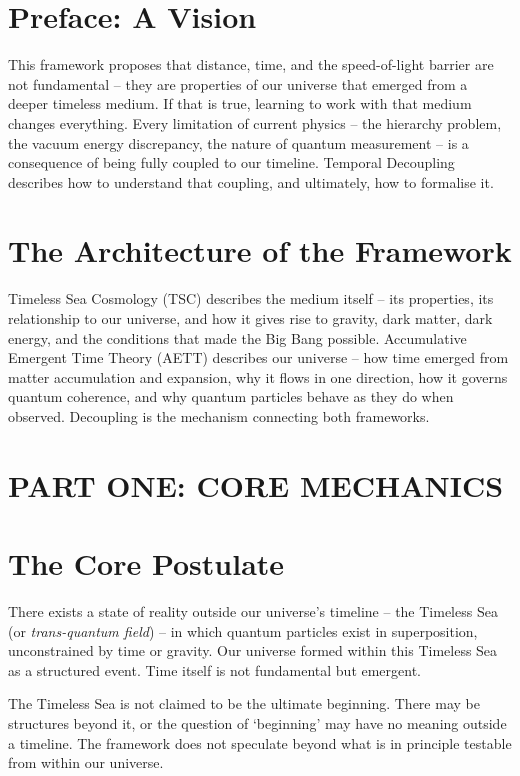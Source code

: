 \documentclass[11pt,a4paper]{article}
\begin{document}
\section*{Preface: A Vision}
This framework proposes that distance, time, and the speed-of-light barrier are not fundamental -- they are properties of our universe that emerged from a deeper timeless medium. If that is true, learning to work with that medium changes everything. Every limitation of current physics -- the hierarchy problem, the vacuum energy discrepancy, the nature of quantum measurement -- is a consequence of being fully coupled to our timeline. Temporal Decoupling describes how to understand that coupling, and ultimately, how to formalise it.

\section*{The Architecture of the Framework}
Timeless Sea Cosmology (TSC) describes the medium itself -- its properties, its relationship to our universe, and how it gives rise to gravity, dark matter, dark energy, and the conditions that made the Big Bang possible. Accumulative Emergent Time Theory (AETT) describes our universe -- how time emerged from matter accumulation and expansion, why it flows in one direction, how it governs quantum coherence, and why quantum particles behave as they do when observed. Decoupling is the mechanism connecting both frameworks.

\section*{PART ONE: CORE MECHANICS}

\section{The Core Postulate}
There exists a state of reality outside our universe's timeline -- the Timeless Sea (or \textit{trans-quantum field}) -- in which quantum particles exist in superposition, unconstrained by time or gravity. Our universe formed within this Timeless Sea as a structured event. Time itself is not fundamental but emergent.

The Timeless Sea is not claimed to be the ultimate beginning. There may be structures beyond it, or the question of `beginning' may have no meaning outside a timeline. The framework does not speculate beyond what is in principle testable from within our universe.
\end{document}
